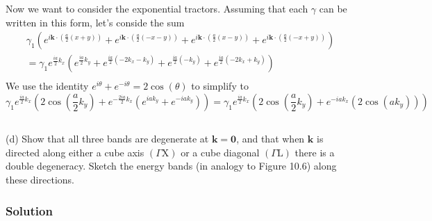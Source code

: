 \documentclass{article}
\begin{document}
Now we want to consider the exponential tractors. Assuming that each $\gamma$ can be written in this form, let's conside the sum
\begin{align}
    \gamma_1\left(e^{i \mathbf{k} \cdot \left(\frac{a}{2}\left(x+y\right)\right)} + e^{i \mathbf{k} \cdot \left(\frac{a}{2}\left(-x-y\right)\right)} + e^{i \mathbf{k} \cdot \left(\frac{a}{2}\left(x-y\right)\right)} + e^{i \mathbf{k} \cdot \left(\frac{a}{2}\left(-x+y\right)\right)}\right)\\
    = \gamma_1e^{\frac{ia}{2} k_x}\left(e^{\frac{ia}{2}k_y}+e^{\frac{ia}{2} \left(-2k_x - k_y\right)} + e^{\frac{ia}{2} \left(-k_y\right)} + e^{\frac{ia}{2} \left(-2k_x + k_y\right)}\right)\\
\end{align}
We use the identity $e^{i\theta}+e^{-i\theta} = 2\cos(\theta)$ to simplify to
\begin{equation}
    \gamma_1e^{\frac{ia}{2} k_x}\left(2\cos\left(\frac{a}{2}k_y\right) + e^{-\frac{2ia}{2}k_x}\left(e^{ia k_y} + e^{-ia k_y}\right)\right) = \gamma_1e^{\frac{ia}{2} k_x}\left(2\cos\left(\frac{a}{2}k_y\right) + e^{-ia k_x}\left(2\cos\left(a k_y\right)\right)\right)
\end{equation}
\subsection{}
(d) Show that all three bands are degenerate at $\mathbf{k}=\mathbf{0}$, and that when $\mathbf{k}$ is directed along either a cube axis $(\Gamma \mathrm{X})$ or a cube diagonal $(\Gamma \mathrm{L})$ there is a double degeneracy. Sketch the energy bands (in analogy to Figure 10.6) along these directions.\\
\subsubsection{Solution}
\end{document}
